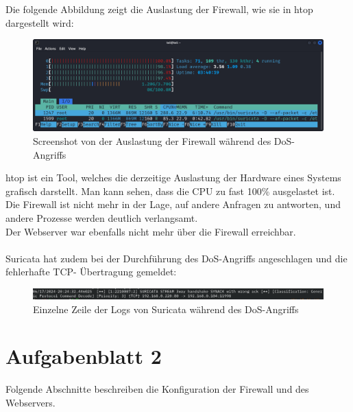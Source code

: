 \documentclass[
    a4paper,
    pagesize,
	pdftex,
    12pt,
]{scrartcl}
\begin{document}
Die folgende Abbildung zeigt die Auslastung der Firewall, wie sie in htop dargestellt wird:
\begin{figure}[H]
	\centering
	\includegraphics[width=12cm]{dos-htop.png}
	\caption{Screenshot von der Auslastung der Firewall während des DoS-Angriffs}
	\label{fig:dos-htop}
\end{figure}
htop ist ein Tool, welches die derzeitige Auslastung der Hardware eines Systems grafisch darstellt. Man kann sehen, dass die CPU zu fast 100\% ausgelastet ist. Die Firewall ist nicht mehr in der Lage, auf andere Anfragen zu antworten, und andere Prozesse werden deutlich verlangsamt. \\
Der Webserver war ebenfalls nicht mehr über die Firewall erreichbar.
\\ \\
Suricata hat zudem bei der Durchführung des DoS-Angriffs angeschlagen und die fehlerhafte TCP- Übertragung gemeldet:
\begin{figure}[H]
	\centering
	\includegraphics[width=17cm]{suricata-spam-dos.png}
	\caption{Einzelne Zeile der Logs von Suricata während des DoS-Angriffs}
	\label{fig:dos-suricata}
\end{figure}

\newpage
\section{Aufgabenblatt 2}
Folgende Abschnitte beschreiben die Konfiguration der Firewall und des Webservers.
\end{document}
